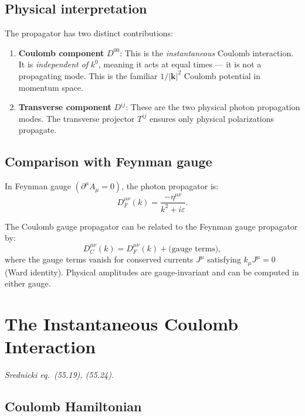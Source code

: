 \documentclass[12pt]{article}
\begin{document}
\subsection{Physical interpretation}

The propagator has two distinct contributions:

\begin{enumerate}
\item \textbf{Coulomb component} $D^{00}$: This is the \emph{instantaneous} Coulomb
  interaction.  It is \emph{independent of} $k^0$, meaning it acts at equal times ---
  it is not a propagating mode.  This is the familiar $1/|\mathbf{k}|^2$ Coulomb potential
  in momentum space.

\item \textbf{Transverse component} $D^{ij}$: These are the two physical photon
  propagation modes.  The transverse projector $T^{ij}$ ensures only physical
  polarizations propagate.
\end{enumerate}

\subsection{Comparison with Feynman gauge}

In Feynman gauge $(\partial^\mu A_\mu = 0)$, the photon propagator is:
\begin{equation}\label{eq:feynman-gauge-prop}
  D_F^{\mu\nu}(k) = \frac{-\eta^{\mu\nu}}{k^2+i\varepsilon}.
\end{equation}

The Coulomb gauge propagator can be related to the Feynman gauge propagator by:
\begin{equation}
  D_C^{\mu\nu}(k) = D_F^{\mu\nu}(k) + \text{(gauge terms)},
\end{equation}
where the gauge terms vanish for conserved currents $J^\mu$ satisfying $k_\mu J^\mu=0$
(Ward identity).  Physical amplitudes are gauge-invariant and can be computed in
either gauge.

\section{The Instantaneous Coulomb Interaction}

\textit{Srednicki eq.\ (55.19), (55.24).}

\subsection{Coulomb Hamiltonian}
\end{document}
